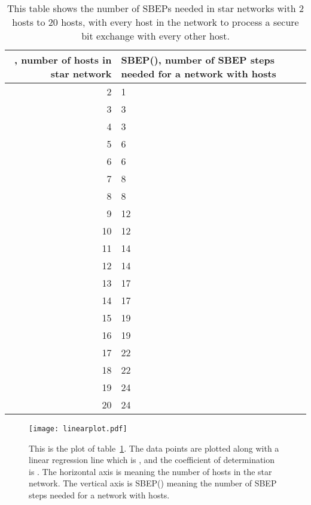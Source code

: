 \documentclass[a4paper,12pt,pdftex]{article}
\begin{document}
\begin{table}[H]
  \begin{center}
    \begin{tabular}{| r | p{6cm} |}
    \hline
    , number of hosts in star network & SBEP(), number of SBEP steps needed for a network with  hosts\\
    \hline
2 & 1 \\
    3 & 3\\
    4 & 3 \\
    5 & 6 \\
    6 & 6 \\
    7 & 8 \\
    8 & 8 \\
    9 & 12 \\
    10 & 12 \\
    11 & 14 \\
    12 & 14 \\
    13 & 17 \\
    14 & 17 \\
    15 & 19 \\
    16 & 19 \\
    17 & 22 \\
    18 & 22 \\
    19 & 24 \\
    20 & 24 \\     
    \hline
    \end{tabular}
  \end{center}
  \caption{This table shows the number of SBEPs needed in star networks with 2 hosts to 20 hosts, with every host in the network to process a secure bit exchange with every other host.}
  \label{table:ab}
\end{table}

\begin{figure}[H]
    \caption{This is the plot of table~\ref{table:ab}. The data points are plotted along with a linear regression line which is , and the coefficient of determination is . The horizontal axis is  meaning the number of hosts in the star network. The vertical axis is SBEP() meaning the number of SBEP steps needed for a network with  hosts.}
    \label{fig:linearplot}
  \centering
\texttt{[image: linearplot.pdf]}
\end{figure}
\end{document}
